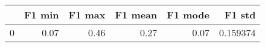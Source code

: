 \begin{tabular}{lrrrrr}
\toprule
{} &  F1 min &  F1 max &  F1 mean &  F1 mode &    F1 std \\
\midrule
0 &    0.07 &    0.46 &     0.27 &     0.07 &  0.159374 \\
\bottomrule
\end{tabular}
